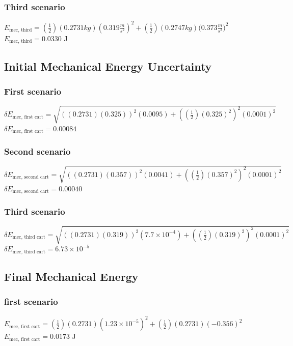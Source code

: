 \documentclass{article}
\begin{document}
\subsubsection{Third scenario}
$E_{\text {mec, third}}=(\frac {1}{2})(0.2731 {kg})(0.319 \frac {m}{s^2})^2 +(\frac {1}{2})(0.2747 {kg})(0.373 {\frac {m}{s^2})}^2 $
\newline
$E_{\text {mec, third}} = 0.0330 \text { J}$


\subsection{Initial Mechanical Energy Uncertainty}
\subsubsection{First scenario}
$\delta E_{\text {mec, first  cart}} = \sqrt{((0.2731)(0.325))^2(0.0095)+((\frac {1}{2})(0.325)^2)^2(0.0001)^2}$
\newline
$\delta E_{\text {mec, first  cart}} = 0.00084 $
\newline

\subsubsection{Second scenario}
$\delta E_{\text {mec, second  cart}} = \sqrt{((0.2731)(0.357))^2(0.0041)+((\frac {1}{2})(0.357)^2)^2(0.0001)^2}$
\newline
$\delta E_{\text {mec, second  cart}} = 0.00040 $
\newline 

\subsubsection{Third scenario}
$\delta E_{\text {mec, third  cart}} = \sqrt{((0.2731)(0.319))^2(7.7 \times 10^{-4})+((\frac {1}{2})(0.319)^2)^2(0.0001)^2}$
\newline
$\delta E_{\text {mec, third  cart}} = 6.73 \times 10^{-5} $
\subsection{Final Mechanical Energy}
\subsubsection{first scenario}
$E_{\text {mec, first cart}} = (\frac {1}{2})(0.2731)(1.23 \times 10^{-5})^2+(\frac {1}{2})(0.2731)(-0.356)^2$
\newline
$E_{\text {mec, first cart}} = 0.0173 \text { J}$
\end{document}
